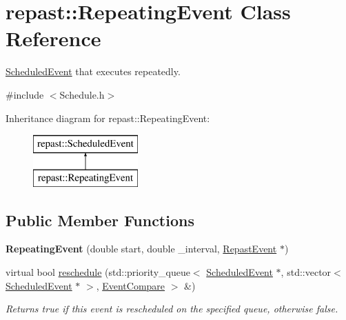 \hypertarget{classrepast_1_1_repeating_event}{\section{repast\-:\-:Repeating\-Event Class Reference}
\label{classrepast_1_1_repeating_event}
}


\hyperlink{classrepast_1_1_scheduled_event}{Scheduled\-Event} that executes repeatedly.  




{\ttfamily \#include $<$Schedule.\-h$>$}

Inheritance diagram for repast\-:\-:Repeating\-Event\-:\begin{figure}[H]
\begin{center}
\leavevmode
\includegraphics[height=2.000000cm]{classrepast_1_1_repeating_event}
\end{center}
\end{figure}
\subsection*{Public Member Functions}
\begin{DoxyCompactItemize}
\item 
\hypertarget{classrepast_1_1_repeating_event_ae91b8afd1d9213187d47a856ce4094ca}{{\bfseries Repeating\-Event} (double start, double \-\_\-interval, \hyperlink{classrepast_1_1_repast_event}{Repast\-Event} $\ast$)}\label{classrepast_1_1_repeating_event_ae91b8afd1d9213187d47a856ce4094ca}

\item 
\hypertarget{classrepast_1_1_repeating_event_a9ebf48f9a13066db44689b07094f5e39}{virtual bool \hyperlink{classrepast_1_1_repeating_event_a9ebf48f9a13066db44689b07094f5e39}{reschedule} (std\-::priority\-\_\-queue$<$ \hyperlink{classrepast_1_1_scheduled_event}{Scheduled\-Event} $\ast$, std\-::vector$<$ \hyperlink{classrepast_1_1_scheduled_event}{Scheduled\-Event} $\ast$ $>$, \hyperlink{classrepast_1_1_event_compare}{Event\-Compare} $>$ \&)}\label{classrepast_1_1_repeating_event_a9ebf48f9a13066db44689b07094f5e39}

\begin{DoxyCompactList}\small\item\em Returns true if this event is rescheduled on the specified queue, otherwise false. \end{DoxyCompactList}\end{DoxyCompactItemize}
